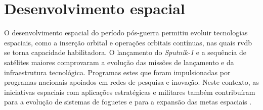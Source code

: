 



\section{Desenvolvimento espacial}

O desenvolvimento espacial do período pós-guerra permitiu evoluir tecnologias espaciais, como a inserção orbital e operações orbitais contínuas, nas quais \gls{rvdb} se torna capacidade habilitadora.
O lançamento do \emph{Sputnik-1} \cite{nasaSputnik1} e a sequência de satélites maiores \cite{sputnik3} comprovaram a evolução das missões de lançamento e da infraestrutura tecnológica.
Programas estes que foram impulsionadas por programas nacionais apoiados em redes de pesquisa e inovação.
Neste contexto, as iniciativas espaciais com aplicações estratégicas e militares também contribuíram para a evolução de sistemas de foguetes e para a expansão das metas espaciais \cite{betzler2024}.

